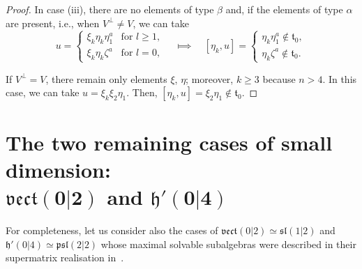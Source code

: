 \documentclass[10pt,a4paper]{amsart}
\newcommand {\fh} {{\mathfrak{h}}}
\newcommand {\fp} {{\mathfrak{p}}} %
\newcommand {\fsl} {{\mathfrak{sl}}}
\newcommand {\ft} {{\mathfrak{t}}}
\newcommand {\fvect} {{\mathfrak{vect}}} %
\newcommand {\<} [2] {{\left.\vphantom{#2}\right.^{#1\!}\!{#2}}}
\numberwithin{equation}{section}
\begin{document}
\begin{proof}
In case (iii), there are no elements of type $\beta$ and, if the elements of type $\alpha$ are present, i.e., when $V^\perp \ne V$, we can take
\[
u=\begin{cases}\xi_k\eta_k\eta_1^a&\text{for $l\ge 1$},\\
\xi_k\eta_k\zeta^a&\text{for $l=0$,}\end{cases}\quad \Longmapsto\quad  [\eta_k,u]=\begin{cases}\eta_k\eta_1^a\notin \ft_0,\\
\eta_k\zeta^a\notin \ft_0.\end{cases}
\]

If $V^\perp = V$, there remain only elements $\xi$, $\eta$; moreover, $k\ge 3$ because $n>4$. In this case, we can take $u=\xi_k\xi_2\eta_1$. Then, $[\eta_k,u]=\xi_2\eta_1\notin \ft_0$. \end{proof}


\section[The two remaining cases of small dimension: vect(0|2) and h'(0|4)]{The two remaining cases of small dimension:\\ $\boldsymbol{\fvect(0|2)}$ and $\boldsymbol{\fh'(0|4)}$}\label{ss5}

For completeness, let us consider also the cases of $\fvect(0|2)\simeq \fsl(1|2)$ and $\fh'(0|4)\simeq \fp\fsl(2|2)$ whose maximal solvable subalgebras were described in their supermatrix realisation in~\cite{S2}.
\end{document}
